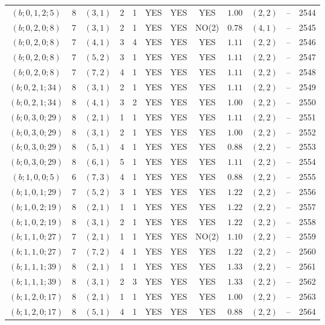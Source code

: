 \begin{longtable}{|c|c|c|c|c|c|c|c|c|c|c|c|}
$(b;0,1,2;5)$ & 8 & $(3,1)$ & 2 & 1 & YES & YES & YES & $1.00$ & $(2,2)$ & -- & 2544\\
$(b;0,2,0;8)$ & 7 & $(3,1)$ & 2 & 1 & YES & YES & NO(2) & $0.78$ & $(4,1)$ & -- & 2545\\
$(b;0,2,0;8)$ & 7 & $(4,1)$ & 3 & 4 & YES & YES & YES & $1.11$ & $(2,2)$ & -- & 2546\\
$(b;0,2,0;8)$ & 7 & $(5,2)$ & 3 & 1 & YES & YES & YES & $1.11$ & $(2,2)$ & -- & 2547\\
$(b;0,2,0;8)$ & 7 & $(7,2)$ & 4 & 1 & YES & YES & YES & $1.11$ & $(2,2)$ & -- & 2548\\
$(b;0,2,1;34)$ & 8 & $(3,1)$ & 2 & 1 & YES & YES & YES & $1.11$ & $(2,2)$ & -- & 2549\\
$(b;0,2,1;34)$ & 8 & $(4,1)$ & 3 & 2 & YES & YES & YES & $1.00$ & $(2,2)$ & -- & 2550\\
$(b;0,3,0;29)$ & 8 & $(2,1)$ & 1 & 1 & YES & YES & YES & $1.11$ & $(2,2)$ & -- & 2551\\
$(b;0,3,0;29)$ & 8 & $(3,1)$ & 2 & 1 & YES & YES & YES & $1.00$ & $(2,2)$ & -- & 2552\\
$(b;0,3,0;29)$ & 8 & $(5,1)$ & 4 & 1 & YES & YES & YES & $0.88$ & $(2,2)$ & -- & 2553\\
$(b;0,3,0;29)$ & 8 & $(6,1)$ & 5 & 1 & YES & YES & YES & $1.11$ & $(2,2)$ & -- & 2554\\
$(b;1,0,0;5)$ & 6 & $(7,3)$ & 4 & 1 & YES & YES & YES & $0.88$ & $(2,2)$ & -- & 2555\\
$(b;1,0,1;29)$ & 7 & $(5,2)$ & 3 & 1 & YES & YES & YES & $1.22$ & $(2,2)$ & -- & 2556\\
$(b;1,0,2;19)$ & 8 & $(2,1)$ & 1 & 1 & YES & YES & YES & $1.22$ & $(2,2)$ & -- & 2557\\
$(b;1,0,2;19)$ & 8 & $(3,1)$ & 2 & 1 & YES & YES & YES & $1.22$ & $(2,2)$ & -- & 2558\\
$(b;1,1,0;27)$ & 7 & $(2,1)$ & 1 & 1 & YES & YES & NO(2) & $1.10$ & $(2,2)$ & -- & 2559\\
$(b;1,1,0;27)$ & 7 & $(7,2)$ & 4 & 1 & YES & YES & YES & $1.22$ & $(2,2)$ & -- & 2560\\
$(b;1,1,1;39)$ & 8 & $(2,1)$ & 1 & 1 & YES & YES & YES & $1.33$ & $(2,2)$ & -- & 2561\\
$(b;1,1,1;39)$ & 8 & $(3,1)$ & 2 & 3 & YES & YES & YES & $1.33$ & $(2,2)$ & -- & 2562\\
$(b;1,2,0;17)$ & 8 & $(2,1)$ & 1 & 1 & YES & YES & YES & $1.00$ & $(2,2)$ & -- & 2563\\
$(b;1,2,0;17)$ & 8 & $(5,1)$ & 4 & 1 & YES & YES & YES & $0.88$ & $(2,2)$ & -- & 2564\\

\end{longtable}
